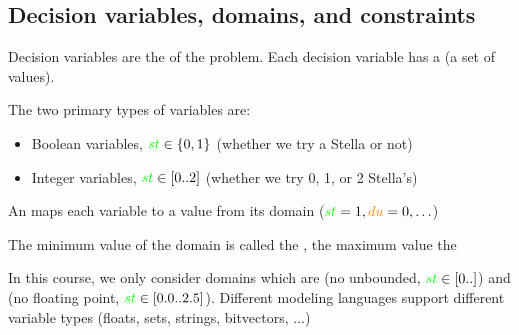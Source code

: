 \documentclass{cons-beamer}
\begin{document}
\begin{flashcardcpmpy}
\begin{frame}[fragile]
	
	
\end{frame}
\end{flashcardcpmpy}


\subsection{Decision variables, domains, and constraints}

\begin{frame}{Decision variables}
	 are the  of the problem.
	Each decision variable has a  (\ie a set of values).

	\parBreak

The two primary types of variables are:

  \begin{itemize}
	  \item Boolean variables, \eg $\textcolor{green}{st} \in \{0,1\}$ (whether we try a Stella or not)
	  \item Integer variables, \eg $\textcolor{green}{st} \in [0..2]$ (whether we try 0, 1, or 2 Stella's)
  \end{itemize}

	\parBreak
	An  maps each variable to a value from its domain (\eg $\textcolor{green}{st} = 1, \textcolor{orange}{du} = 0, \ldots$)

  \parBreak
	The minimum value of the domain is called the , the maximum value the 

\parBreak
	In this course, we only consider  domains which are  (no unbounded, \eg $\textcolor{green}{st} \in [0..]$) and  (no floating point, \eg $\textcolor{green}{st} \in [0.0..2.5]$). Different modeling languages support different variable types (\eg floats, sets, strings, bitvectors, ...)

\end{frame}
\end{document}
